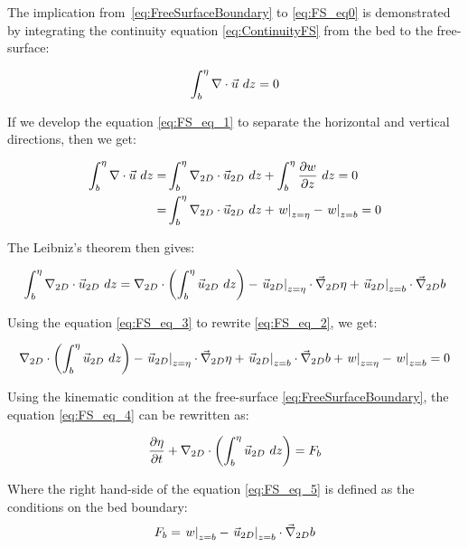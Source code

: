 The implication from~\eqref{eq:FreeSurfaceBoundary} to \eqref{eq:FS_eq0} is demonstrated by integrating the continuity equation \eqref{eq:ContinuityFS} from the bed to the free-surface:

\begin{align}
  \int_b^\eta\nabla \cdot\vec{u}~dz = 0
  \label{eq:FS_eq_1}
\end{align}

If we develop the equation \eqref{eq:FS_eq_1} to separate the horizontal and vertical directions, then we get:

\begin{align}
  \int_b^\eta\nabla \cdot\vec{u}~dz =& \int_b^\eta\nabla_{2D} \cdot\vec{u}_{2D}~dz +\int_b^\eta\dfrac{\partial w}{\partial z}~dz = 0
  \notag\\
  =& \int_b^\eta\nabla_{2D} \cdot\vec{u}_{2D}~dz + \left.w\right\rvert_{z=\eta} - \left.w\right\rvert_{z=b} = 0
  \label{eq:FS_eq_2}
\end{align}

The Leibniz's theorem then gives:

\begin{align}
  \int_b^\eta\nabla_{2D} \cdot\vec{u}_{2D}~dz = \nabla_{2D} \cdot\left(\int_b^\eta\vec{u}_{2D}~dz\right)
  - \left.\vec{u}_{2D}\right\rvert_{z=\eta}\cdot\vec \nabla_{2D}\eta
  + \left.\vec{u}_{2D}\right\rvert_{z=b}\cdot\vec \nabla_{2D}b
  \label{eq:FS_eq_3}
\end{align}

Using the equation \eqref{eq:FS_eq_3} to rewrite \eqref{eq:FS_eq_2}, we get:

\begin{align}
  \nabla_{2D} \cdot\left(\int_b^\eta\vec{u}_{2D}~dz\right) - \left.\vec{u}_{2D}\right\rvert_{z=\eta}\cdot\vec \nabla_{2D}\eta + \left.\vec{u}_{2D}\right\rvert_{z=b}\cdot\vec \nabla_{2D}b + \left.w\right\rvert_{z=\eta} - \left.w\right\rvert_{z=b} = 0
  \label{eq:FS_eq_4}
\end{align}

Using the kinematic condition at the free-surface \eqref{eq:FreeSurfaceBoundary}, the equation \eqref{eq:FS_eq_4} can be rewritten as:

\begin{align}
  \dfrac{\partial\eta}{\partial t} + \nabla_{2D} \cdot\left(\int_b^\eta\vec{u}_{2D}~dz\right) = F_b\notag \\
  \label{eq:FS_eq_5}
\end{align}

Where the right hand-side of the equation \eqref{eq:FS_eq_5} is defined as the conditions on the bed boundary:
\begin{align}
  F_b =
  \left.w\right\rvert_{z=b} - \left.\vec{u}_{2D}\right\rvert_{z=b}\cdot\vec \nabla_{2D}b
\end{align}

